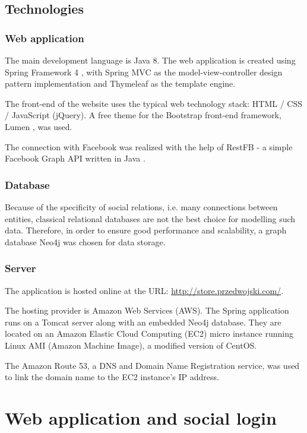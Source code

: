 \documentclass[12pt]{report}
\begin{document}
\subsection{Technologies}
\subsubsection{Web application}
The main development language is Java 8. The web application is created using Spring Framework 4 \cite{spring_framework}, with Spring MVC as the model-view-controller design pattern implementation and Thymeleaf as the template engine. 

The front-end of the website uses the typical web technology stack: HTML / CSS / JavaScript (jQuery). A free theme for the Bootstrap front-end framework, Lumen \cite{lumen}, was used.

The connection with Facebook was realized with the help of RestFB - a simple Facebook Graph API written in Java \cite{restfb}.

\subsubsection{Database}

Because of the specificity of social relations, i.e. many connections between entities, classical relational databases are not the best choice for modelling such data. Therefore, in order to ensure good performance and scalability, a graph database Neo4j \cite{neo4j} was chosen for data storage.

\subsubsection{Server}

The application is hosted online at the URL: \url{http://store.przedwojski.com/}. 

The hosting provider is Amazon Web Services (AWS). The Spring application runs on a Tomcat server along with an embedded Neo4j database. They are located on an Amazon Elastic Cloud Computing (EC2) micro instance running Linux AMI (Amazon Machine Image), a modified version of CentOS.

The Amazon Route 53, a DNS and Domain Name Registration service, was used to link the domain name to the EC2 instance's IP address.

\section{Web application and social login}
\end{document}
